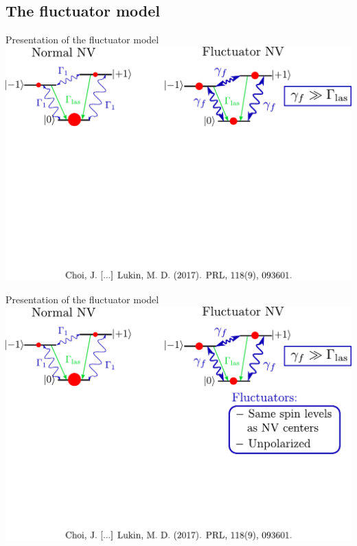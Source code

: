 \documentclass{beamer}
\begin{document}
\subsection{The fluctuator model}
\begin{frame}{Presentation of the fluctuator model}
\centering
\includegraphics[width=\textwidth,height=0.8\textheight,keepaspectratio]{Slide_fluct_intro_f-4}
\end{frame}

\begin{frame}{Presentation of the fluctuator model}
\centering
\includegraphics[width=\textwidth,height=0.8\textheight,keepaspectratio]{Slide_fluct_intro_f-3}
\end{frame}
\end{document}
